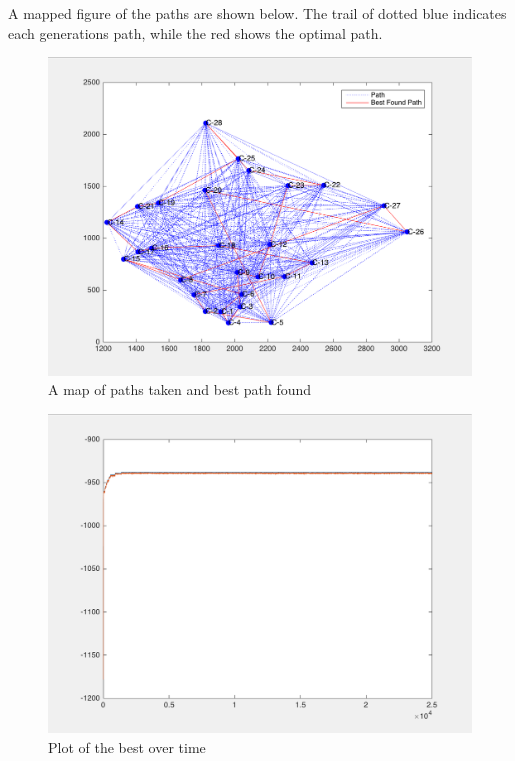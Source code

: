 \documentclass[a4paper, 10pt]{IEEEconf}
\begin{document}
A mapped figure of the paths are shown below. The trail of dotted blue indicates each generations path, while the red shows the optimal path.

\begin{figure}[H]
  \includegraphics[width=0.9\linewidth, center]{images/path}
  \caption{A map of paths taken and best path found}
  \label{fig:A map of paths taken and best path found}
\end{figure}

\begin{figure}[H]
  \includegraphics[width=0.9\linewidth, center]{images/graph}
  \caption{Plot of the best over time}
  \label{fig:Plot of the best over time}
\end{figure}

\end{document}

